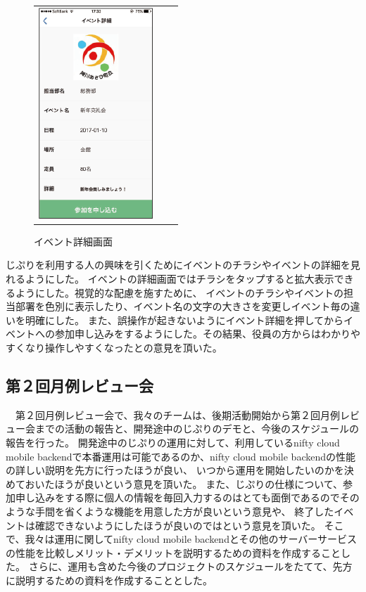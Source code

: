 \begin{figure}[h]
\begin{tabular}{ccc}
      \begin{minipage}[t]{0.3\hsize}
        \centering
        \includegraphics[keepaspectratio, scale=0.45]{picture/ui_update/afterupdate2.png}
        \caption{イベント詳細画面}
        \label{eventdetail}
      \end{minipage}
    \end{tabular}
\end{figure}

じぷりを利用する人の興味を引くためにイベントのチラシやイベントの詳細を見れるようにした。
イベントの詳細画面ではチラシをタップすると拡大表示できるようにした。視覚的な配慮を施すために、
イベントのチラシやイベントの担当部署を色別に表示したり、イベント名の文字の大きさを変更しイベント毎の違いを明確にした。
また、誤操作が起きないようにイベント詳細を押してからイベントへの参加申し込みをするようにした。その結果、役員の方からはわかりやすくなり操作しやすくなったとの意見を頂いた。

\subsection{第２回月例レビュー会}
　第２回月例レビュー会で、我々のチームは、後期活動開始から第２回月例レビュー会までの活動の報告と、開発途中のじぷりのデモと、今後のスケジュールの報告を行った。
開発途中のじぷりの運用に対して、利用しているnifty cloud mobile backendで本番運用は可能であるのか、nifty cloud mobile backendの性能の詳しい説明を先方に行ったほうが良い、
いつから運用を開始したいのかを決めておいたほうが良いという意見を頂いた。
また、じぷりの仕様について、参加申し込みをする際に個人の情報を毎回入力するのはとても面倒であるのでそのような手間を省くような機能を用意した方が良いという意見や、
終了したイベントは確認できないようにしたほうが良いのではという意見を頂いた。
そこで、我々は運用に関してnifty cloud mobile backendとその他のサーバーサービスの性能を比較しメリット・デメリットを説明するための資料を作成することした。
さらに、運用も含めた今後のプロジェクトのスケジュールをたてて、先方に説明するための資料を作成することとした。



